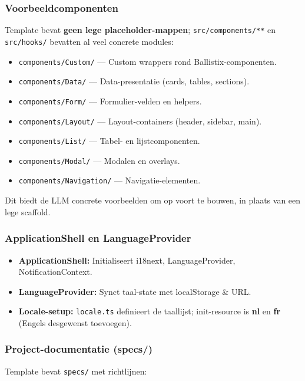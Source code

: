 \subsubsection{Voorbeeldcomponenten}

Template bevat \textbf{geen lege placeholder-mappen}; \texttt{src/components/**} en \texttt{src/hooks/} bevatten al veel concrete modules:

\begin{itemize}
  \item \texttt{components/Custom/} — Custom wrappers rond Ballistix-componenten.
  \item \texttt{components/Data/} — Data-presentatie (cards, tables, sections).
  \item \texttt{components/Form/} — Formulier-velden en helpers.
  \item \texttt{components/Layout/} — Layout-containers (header, sidebar, main).
  \item \texttt{components/List/} — Tabel- en lijstcomponenten.
  \item \texttt{components/Modal/} — Modalen en overlays.
  \item \texttt{components/Navigation/} — Navigatie-elementen.
\end{itemize}

Dit biedt de LLM concrete voorbeelden om op voort te bouwen, in plaats van een lege scaffold.

\subsubsection{ApplicationShell en LanguageProvider}

\begin{itemize}
  \item \textbf{ApplicationShell:} Initialiseert i18next, LanguageProvider, NotificationContext.
  \item \textbf{LanguageProvider:} Synct taal-state met localStorage \& URL.
  \item \textbf{Locale-setup:} \texttt{locale.ts} definieert de taallijst; init-resource is \textbf{nl} en \textbf{fr} (Engels desgewenst toevoegen).
\end{itemize}

\subsubsection{Project-documentatie (specs/)}

Template bevat \texttt{specs/} met richtlijnen:

